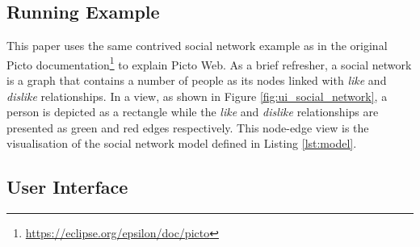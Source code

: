 \documentclass[sigconf,review]{acmart}
\begin{document}
\subsection{Running Example}
\label{sec:running_example}

This paper uses the same contrived social network example as in the original Picto documentation\footnote{\url{https://eclipse.org/epsilon/doc/picto}} to explain Picto Web. As a brief refresher, a social network is a graph that contains a number of people as its nodes linked with \emph{like} and \emph{dislike} relationships. In a view, as shown in Figure \ref{fig:ui_social_network}, a person is depicted as a rectangle while the \emph{like} and \emph{dislike} relationships are presented as green and red edges respectively. This node-edge view is the visualisation of the social network model defined in Listing \ref{lst:model}.

\subsection{User Interface}
\label{sec:user_interface}
\end{document}
